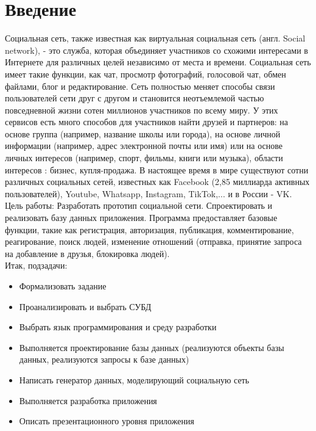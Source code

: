 \chapter*{Введение}


Социальная сеть, также известная как виртуальная социальная сеть (англ. Social network), - это служба, которая объединяет участников со схожими интересами в Интернете для различных целей независимо от места и времени. Социальная сеть имеет такие функции, как чат, просмотр фотографий, голосовой чат, обмен файлами, блог и редактирование. Сеть полностью меняет способы связи пользователей сети друг с другом и становится неотъемлемой частью повседневной жизни сотен миллионов участников по всему миру. У этих сервисов есть много способов для участников найти друзей и партнеров: на основе группа (например, название школы или города), на основе личной информации (например, адрес электронной почты или имя) или на основе личных интересов (например, спорт, фильмы, книги или музыка), области интересов : бизнес, купля-продажа. В настоящее время в мире существуют сотни различных социальных сетей, известных как Facebook (2,85 миллиарда активных пользователей), Youtube, Whatsapp, Instagram, TikTok,... и в России - VK.
\\

Цель работы: Разработать прототип социальной сети. Спроектировать и реализовать базу данных приложения. Программа предоставляет базовые функции, такие как регистрация, авторизация, публикация, комментирование, реагирование, поиск людей, изменение отношений (отправка, принятие запроса на добавление в друзья, блокировка людей).
\\

Итак, подзадачи:

\begin{itemize}
    \setlength{\itemsep}{0em}
    \item Формализовать задание
    \item Проанализировать и выбрать  СУБД
    \item Выбрать язык программирования и среду разработки
    \item Выполняется проектирование базы данных (реализуются объекты базы данных, реализуются запросы к базе данных)
    \item Написать генератор данных, моделирующий социальную сеть
    \item Выполняется разработка приложения
    \item Описать презентационного уровня приложения
\end{itemize}

